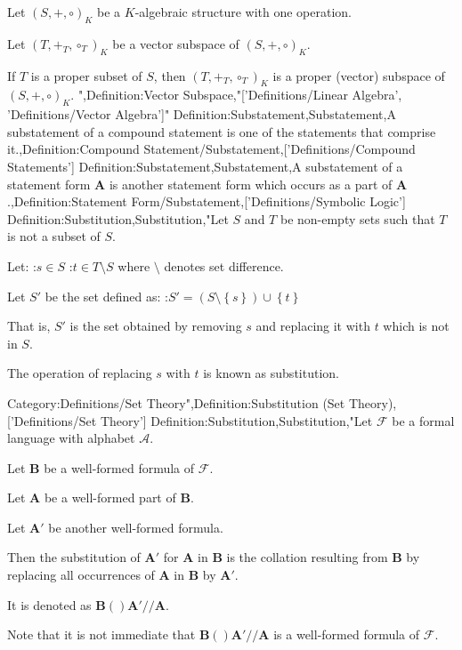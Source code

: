 Let $\left( S, +, \circ \right)_K$ be a $K$-algebraic structure with one operation.

Let $\left( T, +_T, \circ_T \right)_K$ be a vector subspace of $\left( S, +, \circ \right)_K$.


If $T$ is a proper subset of $S$, then $\left( T, +_T, \circ_T \right)_K$ is a proper (vector) subspace of $\left( S, +, \circ \right)_K$.
",Definition:Vector Subspace,"['Definitions/Linear Algebra', 'Definitions/Vector Algebra']"
Definition:Substatement,Substatement,A substatement of a compound statement is one of the statements that comprise it.,Definition:Compound Statement/Substatement,['Definitions/Compound Statements']
Definition:Substatement,Substatement,A substatement of a statement form $\mathbf A$ is another statement form which occurs as a part of $\mathbf A$.,Definition:Statement Form/Substatement,['Definitions/Symbolic Logic']
Definition:Substitution,Substitution,"Let $S$ and $T$ be non-empty sets such that $T$ is not a subset of $S$.

Let:
:$s \in S$
:$t \in T \setminus S$
where $\setminus$ denotes set difference.

Let $S'$ be the set defined as:
:$S' = \left( S \setminus \left\lbrace s \right\rbrace \right) \cup \left\lbrace t \right\rbrace$

That is, $S'$ is the set obtained by removing $s$ and replacing it with $t$ which is not in $S$.


The operation of replacing $s$ with $t$ is known as substitution.


Category:Definitions/Set Theory",Definition:Substitution (Set Theory),['Definitions/Set Theory']
Definition:Substitution,Substitution,"Let $\mathcal F$ be a formal language with alphabet $\mathcal A$.

Let $\mathbf B$ be a well-formed formula of $\mathcal F$.

Let $\mathbf A$ be a well-formed part of $\mathbf B$.

Let $\mathbf A'$ be another well-formed formula.


Then the substitution of $\mathbf A'$ for $\mathbf A$ in $\mathbf B$ is the collation resulting from $\mathbf B$ by replacing all occurrences of $\mathbf A$ in $\mathbf B$ by $\mathbf A'$.

It is denoted as $\mathbf B \left(   \right){\mathbf A' \mathbin {//} \mathbf A}$.


Note that it is not immediate that $\mathbf B \left(   \right){\mathbf A' \mathbin {//} \mathbf A}$ is a well-formed formula of $\mathcal F$.

